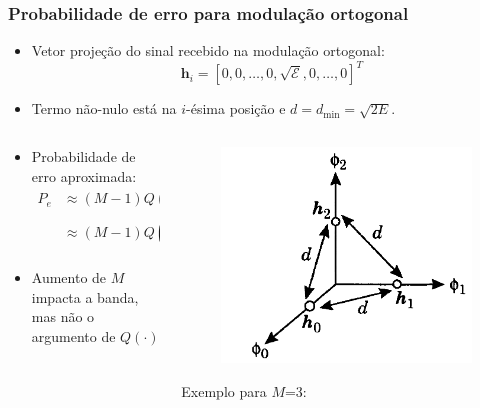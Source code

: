 \begin{frame}
	\frametitle{Probabilidade de erro para modulação ortogonal}

	\begin{itemize}
	    \item Vetor projeção do sinal recebido na modulação ortogonal:
	    \begin{equation*}
		\mathbf{h}_i = [0, 0, \ldots, 0, \sqrt{\mathcal{E}}, 0, \ldots, 0]^T
	    \end{equation*}
	    \item Termo não-nulo está na $i$-ésima posição e $d=d_{\min}= \sqrt{2E}$.
	\end{itemize}
	\begin{columns}
	    \begin{column}{0.5\textwidth}
		\begin{itemize}
		    \item Probabilidade de erro aproximada:
		    \begin{align*}
			P_e &\approx (M-1) Q\left(\frac{d_{\min}}{2\sigma} \right) \\
			&\approx (M-1)Q\left(\sqrt{\frac{\mathcal{E}}{N_0}} \right)
		    \end{align*}
		    \item Aumento de $M$ impacta a banda, mas não o argumento de $Q(\cdot)$
		\end{itemize}		
	    \end{column}
	    \begin{column}{0.5\textwidth}
		\begin{figure}[t]	
		    \begin{center}
		    \includegraphics[width=0.6\columnwidth]{figs/adv_06}
		    \end{center}
		\end{figure}\vspace{-0.3cm}
		\centering \begin{small}Exemplo para $M$=3:\end{small}
	    \end{column}	    
	\end{columns}	
\end{frame}

